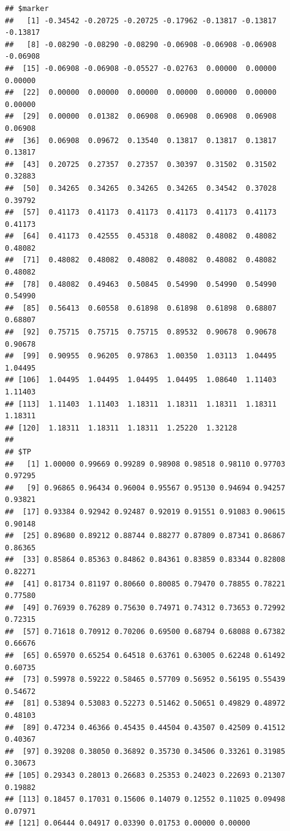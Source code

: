 \documentclass{article}\usepackage[]{graphicx}\usepackage[]{color}
\makeatletter
\newenvironment{kframe}{%
 \def\at@end@of@kframe{}%
 \ifinner\ifhmode%
  \def\at@end@of@kframe{\end{minipage}}%
  \begin{minipage}{\columnwidth}%
 \fi\fi%
 \def\FrameCommand##1{\hskip\@totalleftmargin \hskip-\fboxsep
 \colorbox{shadecolor}{##1}\hskip-\fboxsep
     \hskip-\linewidth \hskip-\@totalleftmargin \hskip\columnwidth}%
 \MakeFramed {\advance\hsize-\width
   \@totalleftmargin\z@ \linewidth\hsize
   \@setminipage}}%
 {\par\unskip\endMakeFramed%
 \at@end@of@kframe}
\newenvironment{knitrout}{}{} %
\makeatother
\begin{document}
\begin{knitrout}
{}


\begin{kframe}\begin{verbatim}
## $marker
##   [1] -0.34542 -0.20725 -0.20725 -0.17962 -0.13817 -0.13817 -0.13817
##   [8] -0.08290 -0.08290 -0.08290 -0.06908 -0.06908 -0.06908 -0.06908
##  [15] -0.06908 -0.06908 -0.05527 -0.02763  0.00000  0.00000  0.00000
##  [22]  0.00000  0.00000  0.00000  0.00000  0.00000  0.00000  0.00000
##  [29]  0.00000  0.01382  0.06908  0.06908  0.06908  0.06908  0.06908
##  [36]  0.06908  0.09672  0.13540  0.13817  0.13817  0.13817  0.13817
##  [43]  0.20725  0.27357  0.27357  0.30397  0.31502  0.31502  0.32883
##  [50]  0.34265  0.34265  0.34265  0.34265  0.34542  0.37028  0.39792
##  [57]  0.41173  0.41173  0.41173  0.41173  0.41173  0.41173  0.41173
##  [64]  0.41173  0.42555  0.45318  0.48082  0.48082  0.48082  0.48082
##  [71]  0.48082  0.48082  0.48082  0.48082  0.48082  0.48082  0.48082
##  [78]  0.48082  0.49463  0.50845  0.54990  0.54990  0.54990  0.54990
##  [85]  0.56413  0.60558  0.61898  0.61898  0.61898  0.68807  0.68807
##  [92]  0.75715  0.75715  0.75715  0.89532  0.90678  0.90678  0.90678
##  [99]  0.90955  0.96205  0.97863  1.00350  1.03113  1.04495  1.04495
## [106]  1.04495  1.04495  1.04495  1.04495  1.08640  1.11403  1.11403
## [113]  1.11403  1.11403  1.18311  1.18311  1.18311  1.18311  1.18311
## [120]  1.18311  1.18311  1.18311  1.25220  1.32128
## 
## $TP
##   [1] 1.00000 0.99669 0.99289 0.98908 0.98518 0.98110 0.97703 0.97295
##   [9] 0.96865 0.96434 0.96004 0.95567 0.95130 0.94694 0.94257 0.93821
##  [17] 0.93384 0.92942 0.92487 0.92019 0.91551 0.91083 0.90615 0.90148
##  [25] 0.89680 0.89212 0.88744 0.88277 0.87809 0.87341 0.86867 0.86365
##  [33] 0.85864 0.85363 0.84862 0.84361 0.83859 0.83344 0.82808 0.82271
##  [41] 0.81734 0.81197 0.80660 0.80085 0.79470 0.78855 0.78221 0.77580
##  [49] 0.76939 0.76289 0.75630 0.74971 0.74312 0.73653 0.72992 0.72315
##  [57] 0.71618 0.70912 0.70206 0.69500 0.68794 0.68088 0.67382 0.66676
##  [65] 0.65970 0.65254 0.64518 0.63761 0.63005 0.62248 0.61492 0.60735
##  [73] 0.59978 0.59222 0.58465 0.57709 0.56952 0.56195 0.55439 0.54672
##  [81] 0.53894 0.53083 0.52273 0.51462 0.50651 0.49829 0.48972 0.48103
##  [89] 0.47234 0.46366 0.45435 0.44504 0.43507 0.42509 0.41512 0.40367
##  [97] 0.39208 0.38050 0.36892 0.35730 0.34506 0.33261 0.31985 0.30673
## [105] 0.29343 0.28013 0.26683 0.25353 0.24023 0.22693 0.21307 0.19882
## [113] 0.18457 0.17031 0.15606 0.14079 0.12552 0.11025 0.09498 0.07971
## [121] 0.06444 0.04917 0.03390 0.01753 0.00000 0.00000

\end{verbatim}
\end{kframe}
\end{knitrout}
\end{document}
